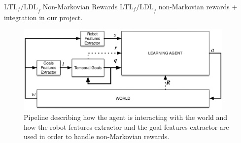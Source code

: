 \begin{frame}{$\text{LTL}_f\text{/LDL}_f$ Non-Markovian Rewards}
    $\text{LTL}_f\text{/LDL}_f$ non-Markovian rewards + integration
    in our project.
    \begin{figure}
        \centering
        \includegraphics[width=0.95\textwidth]{images/rl-temporalgoals-pipeline.png}
        \caption{Pipeline describing how the agent is interacting with the
            world and how the robot features extractor and the goal features
            extractor are used in order to handle non-Markovian rewards.}
        \label{fig:rl-temporalgoals-pipeline}
    \end{figure}
\end{frame}
